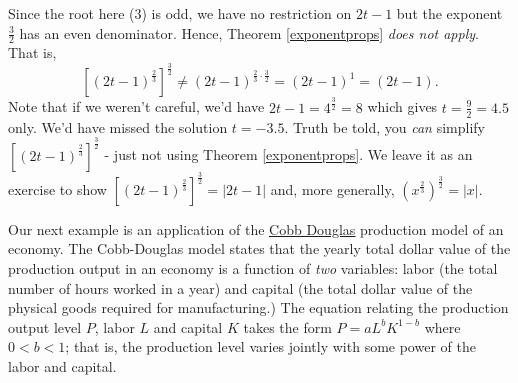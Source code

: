  Since the root here ($3$) is odd, we have no restriction on $2t-1$ but the exponent $\frac{3}{2}$ has an even denominator.  Hence, Theorem \ref{exponentprops} \textit{does not apply}.  That is, \[\left[(2t-1)^{\frac{2}{3}}  \right]^{\frac{3}{2}} \neq (2t-1)^{\frac{2}{3} \cdot \frac{3}{2}} = (2t-1)^{1} = (2t-1).\]
 Note that if we weren't careful, we'd have $2t-1 = 4^{\frac{3}{2}} = 8$ which gives $t= \frac{9}{2} = 4.5$ only.   We'd have missed the solution $t = -3.5$.  Truth be told, you \textit{can} simplify $\left[(2t-1)^{\frac{2}{3}}  \right]^{\frac{3}{2}} $ - just not using Theorem \ref{exponentprops}.  We leave it as an exercise to show  $\left[(2t-1)^{\frac{2}{3}}  \right]^{\frac{3}{2}} = |2t-1|$ and, more generally, $\left(x^{\frac{2}{3}}\right)^{\frac{3}{2}} = |x|$.
 
 Our next example is an application of the  \href{https://en.wikipedia.org/wiki/Cobb-Douglas_production_function}{\underline{Cobb Douglas}} production model of an economy.  The Cobb-Douglas model states that the yearly total dollar value of the production output in an economy is a function of \textit{two} variables:   labor (the total number of hours worked in a year) and capital (the total dollar value of the physical goods required for manufacturing.) The equation relating the production output level $P$, labor $L$ and capital $K$ takes the form $P = a L^{b} K^{1-b}$ where $0 < b < 1$; that is, the production level varies jointly with some power of the labor and capital.  

